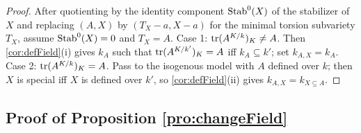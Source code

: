 \begin{proof}
  After quotienting by the identity component \(\operatorname{Stab}^0(X)\) of the stabilizer of \(X\) and
  replacing \((A,X)\) by \((T_X - a, X - a)\) for the minimal torsion subvariety \(T_X\),
  assume \(\operatorname{Stab}^0(X) = 0\) and \(T_X = A\).
  Case 1: \(\operatorname{tr}(A^{K/k})_K \neq A\).  Then \cref{cor:defField}(i) gives \(k_A\) such
  that \(\operatorname{tr}(A^{K/k'})_K = A\) iff \(k_A \subseteq k'\); set \(k_{A,X} = k_A\).
  Case 2: \(\operatorname{tr}(A^{K/k})_K = A\).  Pass to the isogenous model with \(A\) defined over
  \(k\); then \(X\) is special iff \(X\) is defined over \(k'\), so \cref{cor:defField}(ii)
  gives \(k_{A,X} = k_{X \subseteq A}\).
\end{proof}

\subsection{Proof of Proposition \ref{pro:changeField}}

